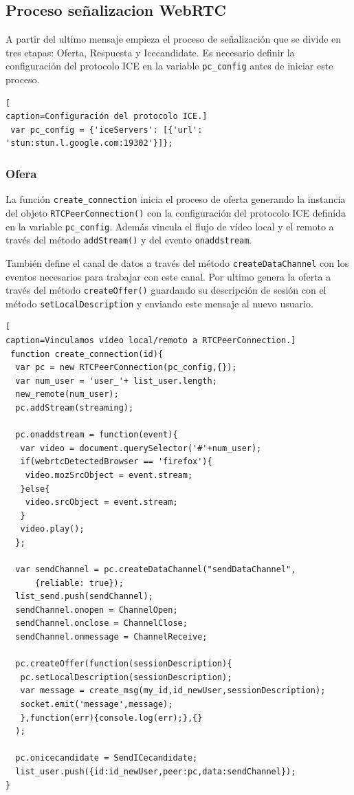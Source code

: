 \subsection*{Proceso señalizacion WebRTC}
A partir del ultimo mensaje empieza el proceso de señalización que se divide en tres etapas: Oferta, Respuesta y Icecandidate. Es necesario definir la configuración del protocolo ICE en la variable \texttt{pc\_config} antes de iniciar este proceso.
\begin{lstlisting}[
caption=Configuración del protocolo ICE.]
 var pc_config = {'iceServers': [{'url': 'stun:stun.l.google.com:19302'}]};
\end{lstlisting}
\subsubsection*{Ofera}
La función \texttt{create\_connection} inicia el proceso de oferta generando la instancia del objeto \texttt{RTCPeerConnection()} con la configuración del protocolo ICE definida en la variable \texttt{pc\_config}. Además vincula el flujo de vídeo local y el remoto a través del método \texttt{addStream()} y del evento \texttt{onaddstream}.

También define el canal de datos a través del método \texttt{createDataChannel} con los eventos necesarios para trabajar con este canal. Por ultimo genera la oferta a través del método \texttt{createOffer()} guardando su descripción de sesión con el método \texttt{setLocalDescription} y enviando este mensaje al nuevo usuario.
\begin{lstlisting}[
caption=Vinculamos vídeo local/remoto a RTCPeerConnection.]
 function create_connection(id){
  var pc = new RTCPeerConnection(pc_config,{});
  var num_user = 'user_'+ list_user.length;
  new_remote(num_user);
  pc.addStream(streaming);
    
  pc.onaddstream = function(event){
   var video = document.querySelector('#'+num_user);
   if(webrtcDetectedBrowser == 'firefox'){
    video.mozSrcObject = event.stream;
   }else{
    video.srcObject = event.stream;
   }
   video.play();
  };
  
  var sendChannel = pc.createDataChannel("sendDataChannel",
      {reliable: true});
  list_send.push(sendChannel);
  sendChannel.onopen = ChannelOpen;
  sendChannel.onclose = ChannelClose;
  sendChannel.onmessage = ChannelReceive;
  
  pc.createOffer(function(sessionDescription){
   pc.setLocalDescription(sessionDescription);
   var message = create_msg(my_id,id_newUser,sessionDescription);
   socket.emit('message',message);
   },function(err){console.log(err);},{}
  );
  
  pc.onicecandidate = SendICecandidate;
  list_user.push({id:id_newUser,peer:pc,data:sendChannel});
}
\end{lstlisting}

